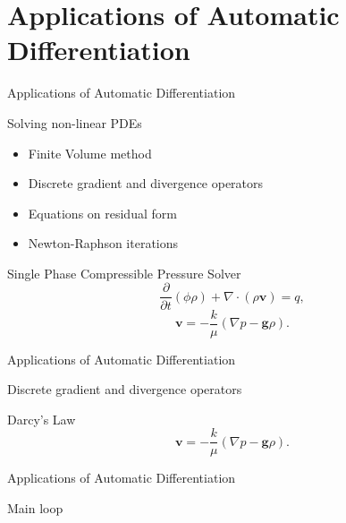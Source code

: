 \section{Applications of Automatic Differentiation}

\begin{frame}{Applications of Automatic Differentiation}
    \begin{block}{Solving non-linear PDEs}
        \begin{itemize}
            \item Finite Volume method
            \item Discrete gradient and divergence operators
            \item Equations on residual form
            \item Newton-Raphson iterations
        \end{itemize}
    \end{block}
        \begin{block}{Single Phase Compressible Pressure Solver}
        \begin{equation*}
            \frac{\partial}{\partial t}(\phi\rho) + \nabla\cdot(\rho\textbf{v}) = q,
        \end{equation*}
        \begin{equation*}
            \textbf{v} = - \frac{k}{\mu}(\nabla p - \textbf{g}\rho).
            \label{eq:pressSolverDarcy}
        \end{equation*}
    \end{block}
\end{frame}

\begin{frame}{Applications of Automatic Differentiation}
    \begin{block}{Discrete gradient and divergence operators}
        
    \end{block}
    \begin{block}{Darcy's Law}
        \begin{equation*}
            \textbf{v} = - \frac{k}{\mu}(\nabla p - \textbf{g}\rho).
            \label{eq:pressSolverDarcy}
        \end{equation*}
        
    
    \end{block}

\end{frame}

\begin{frame}{Applications of Automatic Differentiation}
    \begin{block}{Main loop}
        
    \end{block}
\end{frame}
